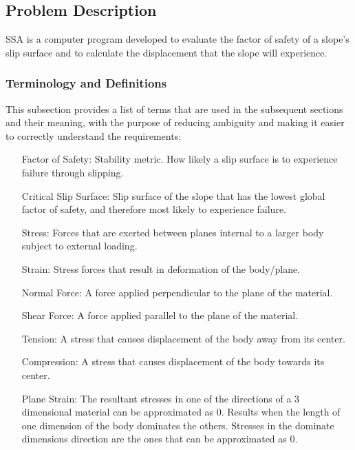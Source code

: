 \documentclass[12pt]{article}
\begin{document}
\subsection{Problem Description}
\label{Sec:ProbDesc}
SSA is a computer program developed to evaluate the factor of safety of a slope's slip surface and to calculate the displacement that the slope will experience.
\subsubsection{Terminology and Definitions}
\label{Sec:TermandDefi}
This subsection provides a list of terms that are used in the subsequent sections and their meaning, with the purpose of reducing ambiguity and making it easier to correctly understand the requirements:
\begin{itemize}
\item[Factor of Safety:]Stability metric. How likely a slip surface is to experience failure through slipping.
\item[Critical Slip Surface:]Slip surface of the slope that has the lowest global factor of safety, and therefore most likely to experience failure.
\item[Stress:]Forces that are exerted between planes internal to a larger body subject to external loading.
\item[Strain:]Stress forces that result in deformation of the body/plane.
\item[Normal Force:]A force applied perpendicular to the plane of the material.
\item[Shear Force:]A force applied parallel to the plane of the material.
\item[Tension:]A stress that causes displacement of the body away from its center.
\item[Compression:]A stress that causes displacement of the body towards its center.
\item[Plane Strain:]The resultant stresses in one of the directions of a 3 dimensional material can be approximated as 0. Results when the length of one dimension of the body dominates the others. Stresses in the dominate dimensions direction are the ones that can be approximated as 0.
\end{itemize}
\end{document}
